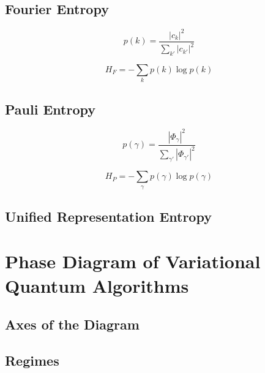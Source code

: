 \documentclass[11pt]{article}
\begin{document}
\subsection{Fourier Entropy}

\begin{equation}
p(k) = \frac{|c_k|^2}{\sum_{k'} |c_{k'}|^2}
\end{equation}

\begin{equation}
H_F = -\sum_k p(k)\log p(k)
\end{equation}


\subsection{Pauli Entropy}

\begin{equation}
p(\gamma) = \frac{|\Phi_\gamma|^2}{\sum_{\gamma'} |\Phi_{\gamma'}|^2}
\end{equation}

\begin{equation}
H_P = -\sum_\gamma p(\gamma)\log p(\gamma)
\end{equation}


\subsection{Unified Representation Entropy}


\section{Phase Diagram of Variational Quantum Algorithms}

\subsection{Axes of the Diagram}


\subsection{Regimes}
\end{document}
